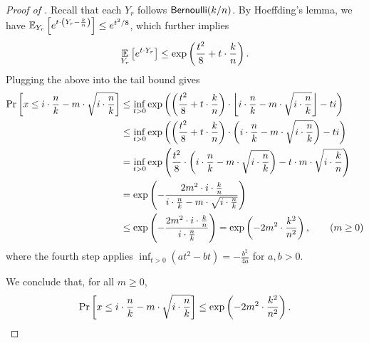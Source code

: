 \begin{proof}[Proof of ]
Recall that each $Y_r$ follows $\mathsf{Bernoulli}(k/n)$. By Hoeffding's lemma, we have $\operatorname*{\mathbb{E}}_{Y_r}\left[e^{t\cdot \left(Y_r - \frac{k}{n}\right)}\right] \le e^{t^2/8}$, which further implies
\[
    \operatorname*{\mathbb{E}}_{Y_r}\left[e^{t\cdot Y_r}\right] \le \exp\left(\frac{t^2}{8} + t\cdot \frac{k}{n}\right).
\]
Plugging the above into the tail bound gives
\begin{align*}
    \Pr_{}\left[x \le i\cdot \frac{n}{k} - m\cdot \sqrt{i\cdot \frac{n}{k}}\right]
    &\le\inf_{t>0}\exp\left(\left(\frac{t^2}{8} + t\cdot \frac{k}{n}\right)\cdot \left\lfloor i\cdot \frac{n}{k} - m\cdot \sqrt{i\cdot \frac{n}{k}}\right\rfloor - ti\right)\\
    &\le\inf_{t>0}\exp\left(\left(\frac{t^2}{8} + t\cdot \frac{k}{n}\right)\cdot \left( i\cdot \frac{n}{k} - m\cdot \sqrt{i\cdot \frac{n}{k}}\right) - ti\right)\\
    &=  \inf_{t > 0}\exp\left(\frac{t^2}{8}\cdot\left(i\cdot\frac{n}{k} - m\cdot\sqrt{i \cdot \frac{n}{k}}\right) - t\cdot m\cdot\sqrt{i\cdot \frac{k}{n}}\right)\\
    &=  \exp\left(-\frac{2m^2 \cdot i\cdot \frac{k}{n}}{i\cdot \frac{n}{k} - m\cdot \sqrt{i\cdot \frac{n}{k}}}\right)\\
    &\le\exp\left(-\frac{2m^2 \cdot i\cdot \frac{k}{n}}{i\cdot \frac{n}{k}}\right)
    =   \exp\left(-2m^2\cdot \frac{k^2}{n^2}\right), \tag{$m \ge 0$}
\end{align*}
where the fourth step applies $\inf_{t > 0}(at^2 - bt) = -\frac{b^2}{4a}$ for $a, b > 0$.

We conclude that, for all $m \ge 0$,
\begin{equation}\label{eq:left-tail-bound}
    \Pr_{}\left[x \le i\cdot \frac{n}{k} - m\cdot \sqrt{i\cdot \frac{n}{k}}\right]
\le \exp\left(-2m^2\cdot \frac{k^2}{n^2}\right).
\end{equation}


\end{proof}
